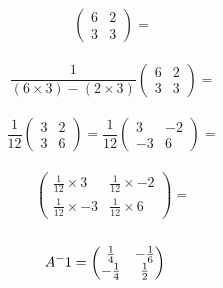 \documentclass[a4paper,10pt]{article}
\begin{document}
      \begin{equation*}
        \begin{pmatrix}
          6 & 2\\3 & 3
        \end{pmatrix}
        =
      \end{equation*}
      \\
      \begin{equation*}
        \frac{1}{(6 \times 3) - (2 \times 3)}
        \begin{pmatrix}
          6 & 2\\3 & 3
        \end{pmatrix}
        =
      \end{equation*}
      \\
      \begin{equation*}
        \frac{1}{12}
        \begin{pmatrix}
          3 & 2\\3 & 6
        \end{pmatrix}
        =
        \frac{1}{12}
        \begin{pmatrix}
          3 & -2\\-3 & 6
        \end{pmatrix}
        =
      \end{equation*}
      \\
      \begin{equation*}
        \begin{pmatrix}
          \frac{1}{12} \times 3 & \frac{1}{12} \times -2\\
          \frac{1}{12} \times -3 & \frac{1}{12} \times 6
        \end{pmatrix}
        =
      \end{equation*}
      \\
      \begin{equation*}
        A^-1 =
        \begin{pmatrix}
          \frac{1}{4} & -\frac{1}{6}\\-\frac{1}{4} & \frac{1}{2}
        \end{pmatrix}
        \hspace{0.4cm}
      \end{equation*}
      \newpage
\end{document}
